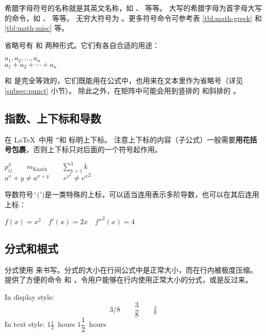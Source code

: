 希腊字母符号的名称就是其英文名称，如 、 等等。
大写的希腊字母为首字母大写的命令，如 、 等等。
无穷大符号为 。更多符号命令可参考表 \ref{tbl:math-greek} 和 \ref{tbl:math-misc} 等。

省略号有  和  两种形式。它们有各自合适的用途：
\begin{example}
$a_1, a_2, \dots, a_n$ \\
$a_1 + a_2 + \cdots + a_n$
\end{example}

 和  是完全等效的，它们既能用在公式中，也用来在文本里作为省略号（详见 \ref{subsec:punct} 小节）。
除此之外，在矩阵中可能会用到竖排的  和斜排的 。

\subsection{指数、上下标和导数}\label{subsec:math-scripts}

在 \LaTeX\ 中用 \texttt\textasciicircum 和 \texttt\textunderscore 标明上下标。
注意上下标的内容（子公式）一般需要\textbf{用花括号包裹}，否则上下标只对后面的一个符号起作用。
\begin{example}
$p^3_{ij} \qquad
m_\mathrm{Knuth}\qquad
\sum_{k=1}^3 k $\\[5pt]
$a^x+y \neq a^{x+y}\qquad
e^{x^2} \neq {e^x}^2$
\end{example}

导数符号\texttt'(${}'$)是一类特殊的上标，可以适当连用表示多阶导数，也可以在其后连用上标：
\begin{example}
$f(x) = x^2 \quad f'(x)
= 2x \quad f''^{2}(x) = 4$
\end{example}

\subsection{分式和根式}\label{subsec:frac-sqrt}

分式使用  来书写。分式的大小在行间公式中是正常大小，而在行内被极度压缩。
 提供了方便的命令  和 ，令用户能够在行内使用正常大小的分式，或是反过来。
\begin{example}
In display style:
\[
3/8 \qquad \frac{3}{8}
\qquad \tfrac{3}{8}
\]
In text style:
$1\frac{1}{2}$~hours \qquad
$1\dfrac{1}{2}$~hours
\end{example}

